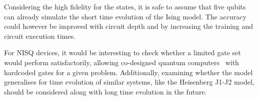 Considering the high fidelity for the states, it is safe to assume that five qubits can already simulate the short time evolution of the Ising model. The accuracy could however be improved with circuit depth and by increasing the training and circuit execution times. 

For NISQ devices, it would be interesting to check whether a limited gate set would perform satisfactorily, allowing co-designed quantum computers~\cite{Algaba2022} with hardcoded gates for a given problem. Additionally, examining whether the model generalises for time evolution of similar systems, like the Heisenberg J1-J2 model, should be considered along with long time evolution in the future.






\setlength{}
\renewcommand*{\bibfont}{\fontsize{8.5pt}{10.7pt}\selectfont}  %
\printbibliography{}



